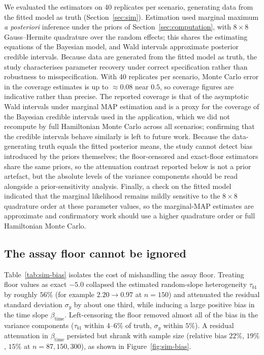 \documentclass[11pt]{article}
\begin{document}
We evaluated the estimators on 40 replicates per scenario, generating data
from the fitted model as truth (Section~\ref{sec:sim}). Estimation used
marginal maximum \emph{a posteriori} inference under the priors of
Section~\ref{sec:computation}, with $8\times8$ Gauss--Hermite quadrature
over the random effects; this shares the estimating equations of the
Bayesian model, and Wald intervals approximate posterior credible intervals.
Because data are generated from the fitted model as truth, the study
characterises parameter recovery under correct specification rather than
robustness to misspecification. With 40 replicates per scenario, Monte Carlo
error in the coverage estimates is up to $\approx0.08$ near $0.5$, so coverage
figures are indicative rather than precise. The reported coverage is that of
the asymptotic Wald intervals under marginal MAP estimation and is a proxy for
the coverage of the Bayesian credible intervals used in the application, which
we did not recompute by full Hamiltonian Monte Carlo across all scenarios;
confirming that the credible intervals behave similarly is left to future
work. Because the data-generating truth equals the fitted posterior means, the
study cannot detect bias introduced by the priors themselves; the
floor-censored and exact-floor estimators share the same priors, so the
attenuation contrast reported below is not a prior artefact, but the absolute
levels of the variance components should be read alongside a prior-sensitivity
analysis. Finally, a check on the fitted model indicated that the marginal
likelihood remains mildly sensitive to the $8\times8$ quadrature order at these
parameter values, so the marginal-MAP estimates are approximate and
confirmatory work should use a higher quadrature order or full Hamiltonian
Monte Carlo.

\subsection{The assay floor cannot be ignored}

Table~\ref{tab:sim-bias} isolates the cost of mishandling the assay floor.
Treating floor values as exact $-5.0$ collapsed the estimated random-slope
heterogeneity $\tau_{b1}$ by roughly $56\%$ (for example $2.20\to0.97$ at
$n=150$) and attenuated the residual standard deviation $\sigma_y$ by about
one third, while inducing a large positive bias in the time slope
$\beta_{\mathrm{time}}$. Left-censoring the floor removed almost all of the
bias in the variance components ($\tau_{b1}$ within $4$--$6\%$ of truth,
$\sigma_y$ within $5\%$). A residual attenuation in $\beta_{\mathrm{time}}$
persisted but shrank with sample size (relative bias $22\%$, $19\%$, $15\%$
at $n=87,150,300$), as shown in Figure~\ref{fig:sim-bias}.
\end{document}
